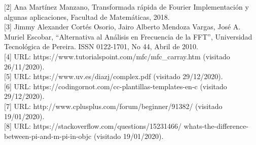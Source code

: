 \documentclass[12pt,letterpaper]{article}
\begin{document}
[2] Ana Martínez Manzano,  Transformada rápida de Fourier Implementación y algunas aplicaciones, Facultad de Matemáticas, 2018. \\

[3] Jimmy Alexander Cortés Osorio, Jairo Alberto Mendoza Vargas, José A. Muriel Escobar, “Alternativa al Análisis en Frecuencia de la FFT”, Universidad Tecnológica de Pereira. ISSN 0122-1701, No 44, Abril de 2010. \\

[4] URL: https://www.tutorialspoint.com/mfc/mfc_carray.htm (visitado 26/11/2020). \\

[5] URL: https://www.uv.es/diazj/complex.pdf (visitado 29/12/2020). \\

[6] URL: https://codingornot.com/cc-plantillas-templates-en-c (visitado 29/12/2020). \\

[7] URL: http://www.cplusplus.com/forum/beginner/91382/ (visitado 19/01/2020). \\

[8] URL: https://stackoverflow.com/questions/15231466/
    whats-the-difference-between-pi-and-m-pi-in-objc   (visitado 19/01/2020).
\end{document}
